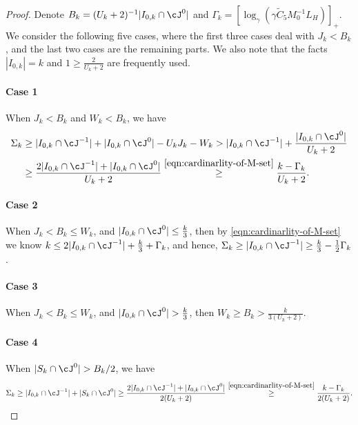 \begin{proof}
    Denote $B_k = (U_k + 2)^{-1}|
    I_{0,k} \cap \cJ^0|$
    and $\Gamma_k = [\log_\gamma(\gamma\tilde C_5 M_0^{-1}L_H)]_+$. 
    We consider the following five cases, where the first three cases deal with $J_k < B_k$, and the last two cases are the remaining parts.  
    We also note that the facts $|I_{0,k}|=k$ and  $1 \geq \frac{2}{U_k + 2}$ are frequently used.

    \paragraph{Case 1}
    When $J_k < B_k$ and $W_k < B_k$, we have 
    \begin{align*}
        \Sigma_k 
        &\geq 
        |%
        I_{0,k}\cap \cJ^{-1}| 
        + |%
        I_{0,k}\cap \cJ^{0}| 
        - U_kJ_k - W_k
        >
        |%
        I_{0,k}\cap \cJ^{-1}| 
        + \frac{|%
        I_{0,k}\cap \cJ^{0}|}{U_k+2} \\
        &\geq 
        \frac{2|%
        I_{0,k}\cap \cJ^{-1}| + |%
        I_{0,k}\cap \cJ^{0}|}{U_k+2}
        \overset{\eqref{eqn:cardinarlity-of-M-set}}{\geq} 
        \frac{k - \Gamma_k}{U_k+2}.
    \end{align*}
    
    \paragraph{Case 2}
    When $J_k < B_k \leq W_k$, and $|%
    I_{0,k}\cap \cJ^0| \leq \frac{k}{3}$, 
    then by \eqref{eqn:cardinarlity-of-M-set} we know 
    $k \leq 2|%
    I_{0,k}\cap \cJ^{-1}| + \frac{k}{3} + \Gamma_k$, and hence, 
    $\Sigma_k \geq |%
    I_{0,k}\cap \cJ^{-1}| \geq \frac{k}{3} - \frac{1}{2}\Gamma_k$.

    \paragraph{Case 3}
    When $J_k < B_k \leq W_k$, and $|%
    I_{0,k}\cap \cJ^0| > \frac{k}{3}$, 
    then $W_k \geq B_k > \frac{k}{3(U_k+2)}$.

    \paragraph{Case 4}
    When $|S_k \cap \cJ^0| > B_k/2$, we have
    \begin{align*}
        \Sigma_k 
        \geq 
        |%
        I_{0,k}\cap \cJ^{-1}| + |S_k\cap \cJ^0|
        \geq \frac{2|%
        I_{0,k}\cap \cJ^{-1}|+|%
        I_{0,k}\cap\cJ^0|}{2(U_k+2)}
        \overset{\eqref{eqn:cardinarlity-of-M-set}}{\geq} 
        \frac{k - \Gamma_k}{2(U_k+2)}.
    \end{align*}


\end{proof}
